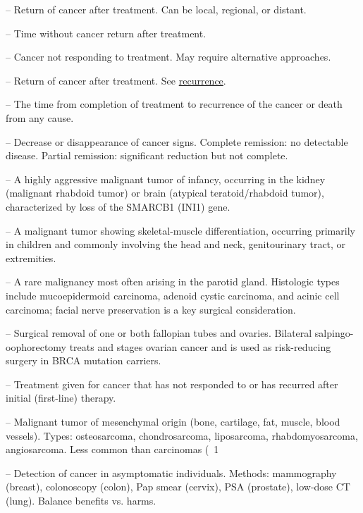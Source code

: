 -- Return of cancer after treatment. Can be local, regional, or distant.

-- Time without cancer return after treatment.

-- Cancer not responding to treatment. May require alternative approaches.

-- Return of cancer after treatment. See \hyperlink{Recurrence}{recurrence}.

-- The time from completion of treatment to recurrence of the cancer or death from any cause.

-- Decrease or disappearance of cancer signs. Complete remission: no detectable disease. Partial remission: significant reduction but not complete.

-- A highly aggressive malignant tumor of infancy, occurring in the kidney (malignant rhabdoid tumor) or brain (atypical teratoid/rhabdoid tumor), characterized by loss of the SMARCB1 (INI1) gene.

-- A malignant tumor showing skeletal-muscle differentiation, occurring primarily in children and commonly involving the head and neck, genitourinary tract, or extremities.

-- A rare malignancy most often arising in the parotid gland. Histologic types include mucoepidermoid carcinoma, adenoid cystic carcinoma, and acinic cell carcinoma; facial nerve preservation is a key surgical consideration.

-- Surgical removal of one or both fallopian tubes and ovaries. Bilateral salpingo-oophorectomy treats and stages ovarian cancer and is used as risk-reducing surgery in BRCA mutation carriers.

-- Treatment given for cancer that has not responded to or has recurred after initial (first-line) therapy.

-- Malignant tumor of mesenchymal origin (bone, cartilage, fat, muscle, blood vessels). Types: osteosarcoma, chondrosarcoma, liposarcoma, rhabdomyosarcoma, angiosarcoma. Less common than carcinomas (~1%

-- Detection of cancer in asymptomatic individuals. Methods: mammography (breast), colonoscopy (colon), Pap smear (cervix), PSA (prostate), low-dose CT (lung). Balance benefits vs. harms.

